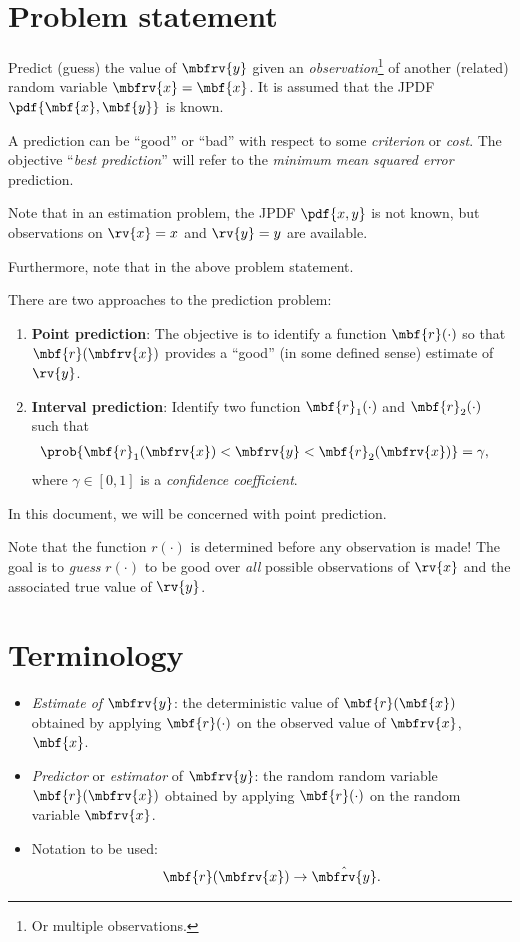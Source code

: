 \section{Problem statement}
Predict (guess) the value of $\mbfrv{y}$ given an \emph{observation}\footnote{Or multiple observations.} of another (related) random variable $\mbfrv{x} = \mbf{x}$. It is assumed that the JPDF $\pdf{\mbf{x},\mbf{y}}$ is known.

A prediction can be ``good'' or ``bad'' with respect to some \emph{criterion} or \emph{cost}. The objective ``\emph{best prediction}'' will refer to the \emph{minimum mean squared error} prediction.

\begin{myBlueBox}
    Note that in an estimation problem, the JPDF $\pdf{x,y}$ is not known, but observations on $\rv{x}=x$ and $\rv{y}=y$ are available.

    Furthermore, note that in the above problem statement.
\end{myBlueBox}

There are two approaches to the prediction problem:
\begin{enumerate}
    \item \textbf{Point prediction}: The objective is to identify a function $\mbf{r}(\cdot)$ so that $\mbf{r}(\mbfrv{x})$ provides a ``good'' (in some defined sense) estimate of $\rv{y}$.
    \item \textbf{Interval prediction}: Identify two function $\mbf{r}_{1}(\cdot)$ and $\mbf{r}_{2}(\cdot)$ such that 
    \begin{align}
        \prob{\mbf{r}_{1}(\mbfrv{x})<\mbfrv{y} < \mbf{r}_{2}(\mbfrv{x})} &= \gamma,
    \end{align}
    where $\gamma\in[0,1]$ is a \emph{confidence coefficient}.
\end{enumerate}
In this document, we will be concerned with point prediction. 

\begin{myBlackBox}
    Note that the function $r(\cdot)$ is determined before any observation is made! The goal is to \emph{guess} $r(\cdot)$ to be good over \emph{all} possible observations of $\rv{x}$ and the associated true value of $\rv{y}$.
\end{myBlackBox}

\section*{Terminology}
\begin{itemize}
    \item \emph{Estimate of $\mbfrv{y}$}: the deterministic value of $\mbf{r}(\mbf{x})$ obtained by applying $\mbf{r}(\cdot)$ on the observed value of $\mbfrv{x}$, $\mbf{x}$.
    \item \emph{Predictor} or \emph{estimator} of $\mbfrv{y}$: the random random variable $\mbf{r}(\mbfrv{x})$ obtained by applying $\mbf{r}(\cdot)$ on the random variable $\mbfrv{x}$.
    \item Notation to be used: 
    \begin{align}
        \mbf{r}(\mbfrv{x}) \to \hat{\mbfrv{y}}.
    \end{align}
\end{itemize}

